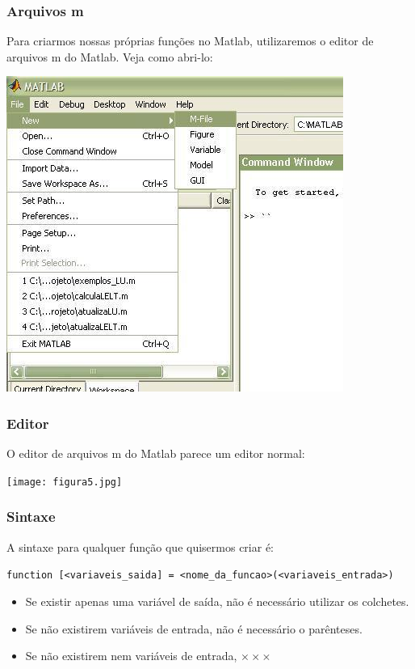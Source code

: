 \documentclass{beamer}
\begin{document}
\begin{frame}
\frametitle{Arquivos m}

Para criarmos nossas pr\'oprias fun\c{c}\~oes no Matlab, utilizaremos o editor de arquivos m do Matlab. Veja como abri-lo:
\begin{center}
\includegraphics[scale=0.5]{figura4.jpg}
\end{center}

\end{frame}

\begin{frame}
 \frametitle{Editor}

 O editor de arquivos m do Matlab parece um editor normal:
 \begin{center}
 \texttt{[image: figura5.jpg]}
 \end{center}

\end{frame}

\begin{frame}
 \frametitle{Sintaxe}

A sintaxe para qualquer fun\c{c}\~ao que quisermos criar \'e:

{\scriptsize \tt function [<variaveis\_saida] = <nome\_da\_funcao>(<variaveis\_entrada>)}

\begin{itemize}
\item<2-> Se existir apenas uma vari\'avel de sa\'ida, n\~ao \'e necess\'ario utilizar os colchetes.
\item<3-> Se n\~ao existirem vari\'aveis de entrada, n\~ao \'e necess\'ario o par\^enteses.
\item<4-> Se n\~ao existirem nem vari\'aveis de entrada, $\times \times \times$
\end{itemize}

\end{frame}
\end{document}
